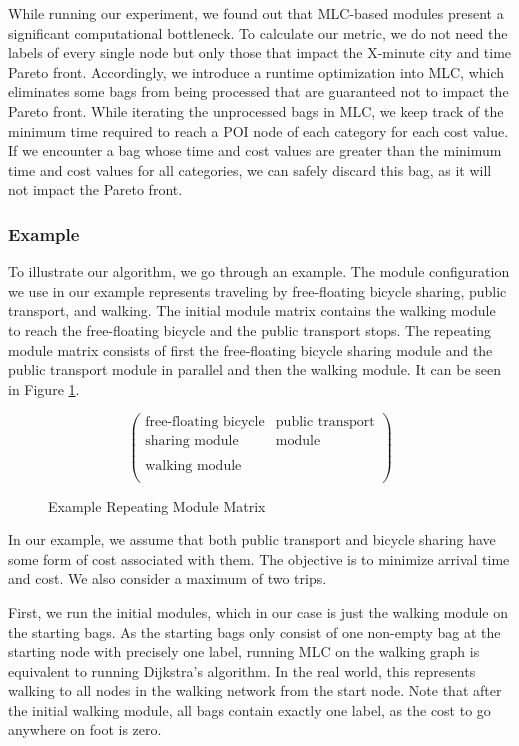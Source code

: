 While running our experiment, we found out that MLC-based modules present a significant computational bottleneck.
To calculate our metric, we do not need the labels of every single node but only those that impact the X-minute city and time Pareto front.
Accordingly, we introduce a runtime optimization into MLC, which eliminates some bags from being processed that are guaranteed not to impact the Pareto front.
While iterating the unprocessed bags in MLC, we keep track of the minimum time required to reach a POI node of each category for each cost value.
If we encounter a bag whose time and cost values are greater than the minimum time and cost values for all categories, we can safely discard this bag, as it will not impact the Pareto front.


\subsubsection{Example}
\label{subsubsec:example}

To illustrate our algorithm, we go through an example.
The module configuration we use in our example represents traveling by free-floating bicycle sharing, public transport, and walking.
The initial module matrix contains the walking module to reach the free-floating bicycle and the public transport stops.
The repeating module matrix consists of first the free-floating bicycle sharing module and the public transport module in parallel and then the walking module.
It can be seen in Figure \ref{fig:example_module_matrix}.


\begin{figure}[ht]
\centering
\[
\begin{pmatrix}
\text{free-floating bicycle} & \text{public transport} \\
\text{sharing module} & \text{module} \\
\\
\text{walking module} & \\
\end{pmatrix}
\]
\caption{Example Repeating Module Matrix}
\label{fig:example_module_matrix}
\end{figure}

In our example, we assume that both public transport and bicycle sharing have some form of cost associated with them.
The objective is to minimize arrival time and cost.
We also consider a maximum of two trips.

First, we run the initial modules, which in our case is just the walking module on the starting bags.
As the starting bags only consist of one non-empty bag at the starting node with precisely one label, running MLC on the walking graph is equivalent to running Dijkstra's algorithm.
In the real world, this represents walking to all nodes in the walking network from the start node.
Note that after the initial walking module, all bags contain exactly one label, as the cost to go anywhere on foot is zero.

